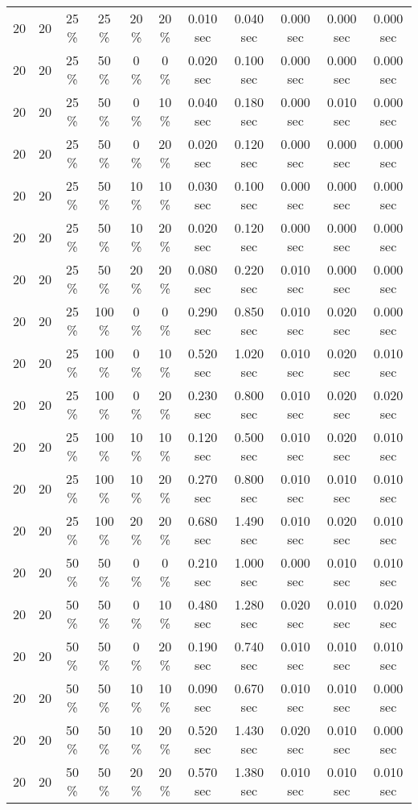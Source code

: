 \documentclass{article}
\begin{document}
\begin{longtable}[]{@{}ccccccccccc@{}}
20 & 20 & 25 \% & 25 \% & 20 \% & 20 \% & 0.010 sec & 0.040 sec & 0.000 sec & 0.000 sec & 0.000 sec \\
20 & 20 & 25 \% & 50 \% & 0 \% & 0 \% & 0.020 sec & 0.100 sec & 0.000 sec & 0.000 sec & 0.000 sec \\
20 & 20 & 25 \% & 50 \% & 0 \% & 10 \% & 0.040 sec & 0.180 sec & 0.000 sec & 0.010 sec & 0.000 sec \\
20 & 20 & 25 \% & 50 \% & 0 \% & 20 \% & 0.020 sec & 0.120 sec & 0.000 sec & 0.000 sec & 0.000 sec \\
20 & 20 & 25 \% & 50 \% & 10 \% & 10 \% & 0.030 sec & 0.100 sec & 0.000 sec & 0.000 sec & 0.000 sec \\
20 & 20 & 25 \% & 50 \% & 10 \% & 20 \% & 0.020 sec & 0.120 sec & 0.000 sec & 0.000 sec & 0.000 sec \\
20 & 20 & 25 \% & 50 \% & 20 \% & 20 \% & 0.080 sec & 0.220 sec & 0.010 sec & 0.000 sec & 0.000 sec \\
20 & 20 & 25 \% & 100 \% & 0 \% & 0 \% & 0.290 sec & 0.850 sec & 0.010 sec & 0.020 sec & 0.000 sec \\
20 & 20 & 25 \% & 100 \% & 0 \% & 10 \% & 0.520 sec & 1.020 sec & 0.010 sec & 0.020 sec & 0.010 sec \\
20 & 20 & 25 \% & 100 \% & 0 \% & 20 \% & 0.230 sec & 0.800 sec & 0.010 sec & 0.020 sec & 0.020 sec \\
20 & 20 & 25 \% & 100 \% & 10 \% & 10 \% & 0.120 sec & 0.500 sec & 0.010 sec & 0.020 sec & 0.010 sec \\
20 & 20 & 25 \% & 100 \% & 10 \% & 20 \% & 0.270 sec & 0.800 sec & 0.010 sec & 0.010 sec & 0.010 sec \\
20 & 20 & 25 \% & 100 \% & 20 \% & 20 \% & 0.680 sec & 1.490 sec & 0.010 sec & 0.020 sec & 0.010 sec \\
20 & 20 & 50 \% & 50 \% & 0 \% & 0 \% & 0.210 sec & 1.000 sec & 0.000 sec & 0.010 sec & 0.010 sec \\
20 & 20 & 50 \% & 50 \% & 0 \% & 10 \% & 0.480 sec & 1.280 sec & 0.020 sec & 0.010 sec & 0.020 sec \\
20 & 20 & 50 \% & 50 \% & 0 \% & 20 \% & 0.190 sec & 0.740 sec & 0.010 sec & 0.010 sec & 0.010 sec \\
20 & 20 & 50 \% & 50 \% & 10 \% & 10 \% & 0.090 sec & 0.670 sec & 0.010 sec & 0.010 sec & 0.000 sec \\
20 & 20 & 50 \% & 50 \% & 10 \% & 20 \% & 0.520 sec & 1.430 sec & 0.020 sec & 0.010 sec & 0.000 sec \\
20 & 20 & 50 \% & 50 \% & 20 \% & 20 \% & 0.570 sec & 1.380 sec & 0.010 sec & 0.010 sec & 0.010 sec \\

\end{longtable}
\end{document}
